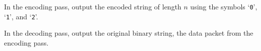 
    In the encoding pass, output the encoded string of length $n$ using the symbols `\texttt{0}', `\texttt{1}', and `\texttt{2}'.

    In the decoding pass, output the original binary string, the data packet from the encoding pass.
